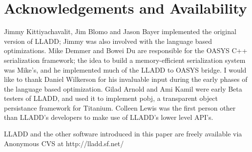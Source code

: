 \documentclass[10pt,letterpaper,twocolumn,english]{article}
\newcommand{\yad}{LLADD\xspace}
\newcommand{\oasys}{OASYS\xspace}
\begin{document}
\section{Acknowledgements and Availability}

Jimmy Kittiyachavalit, Jim Blomo and Jason Bayer implemented the
original version of \yad; Jimmy was also involved with the language
based optimizations. Mike Demmer and Bowei Du are responsible for the
\oasys C++ serialization framework; the idea to build a
memory-efficient serialization system was Mike's, and he implemented
much of the \yad to \oasys bridge. I would like to thank Daniel
Wilkerson for his invaluable input during the early phases of the
language based optimization.  Gilad Arnold and Ami Kamil were early
Beta testers of \yad, and used it to implement pobj, a transparent
object persistance framework for Titanium.  Colleen Lewis was the first
person other than \yad's developers to make use of \yad's lower level
API's.

\yad and the other software introduced in this paper are freely
available via Anonymous CVS at http://lladd.sf.net/
\end{document}
